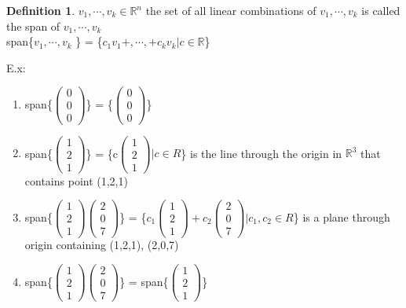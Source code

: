 \documentclass{article}
\theoremstyle{definition}
\newtheorem{definition}{Definition}[section]
\theoremstyle{thrm}
\begin{document}
\begin{definition}
	$v_1,\cdots,v_k \in \mathbb{R}^n$ the set of all linear combinations of $v_1,\cdots, v_k$ is called the span of $v_1,\cdots, v_k$ \\
	span\{$v_1,\cdots, v_k$ \} = \{$c_1v_1+,\cdots, +c_kv_k | c\in \mathbb{R}$\}
\end{definition}
E.x: 
\begin{enumerate}
	\item span\{$\begin{pmatrix}
		0\\0\\0
	\end{pmatrix}$\} = \{$\begin{pmatrix}
		0\\0\\0
	\end{pmatrix}$\}
	\item span\{$\begin{pmatrix}
		1\\2\\1
	\end{pmatrix}$\} = \{c$\begin{pmatrix}
		1\\2\\1
	\end{pmatrix} | c \in R$\} is the line through the origin in $\mathbb{R}^3$ that contains point (1,2,1)
	\item span\{$\begin{pmatrix}
		1\\2\\1
	\end{pmatrix}\begin{pmatrix}
		2\\0\\7
	\end{pmatrix}$\} = \{$c_1\begin{pmatrix}
		1\\2\\1
	\end{pmatrix}+c_2\begin{pmatrix}
		2\\0\\7
	\end{pmatrix} | c_1, c_2 \in R $\} is a plane through origin containing (1,2,1), (2,0,7)
	\item span\{$\begin{pmatrix}
		1\\2\\1
	\end{pmatrix}\begin{pmatrix}
		2\\0\\7
	\end{pmatrix}$\} = span\{$\begin{pmatrix}
		1\\2\\1
	\end{pmatrix}$\}
\end{enumerate}
\end{document}
